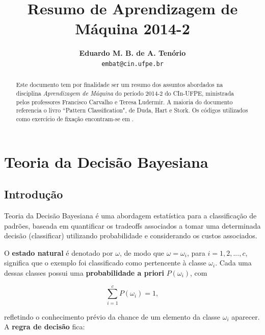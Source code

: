 \documentclass[a4paper,12pt,twocolumn]{article}
\begin{document}
\title{\textbf{Resumo de Aprendizagem de Máquina 2014-2}}
\author{
    \textbf{Eduardo M. B. de A. Tenório}\\
    \small{\texttt{embat@cin.ufpe.br}}
}
\date{}

\maketitle


\begin{abstract}
\begin{itshape}
Este documento tem por finalidade ser um resumo dos assuntos abordados na disciplina \emph{Aprendizagem de Máquina} do período 2014-2 do CIn-UFPE, ministrada pelos professores Francisco Carvalho e Teresa Ludermir. A maioria do documento referencia o livro ``Pattern Classification", de Duda, Hart e Stork. Os códigos utilizados como exercício de fixação encontram-se em .
\end{itshape}
\end{abstract}


\section{Teoria da Decisão Bayesiana}

\subsection{Introdução}

Teoria da Decisão Bayesiana é uma abordagem estatística para a classificação de
padrões, baseada em quantificar os tradeoffs associados a tomar uma determinada
decisão (classificar) utilizando probabilidade e considerando os custos associados.

O \textbf{estado natural} é denotado por $\omega$, de modo que $\omega = \omega_i$, para $i = 1, 2, ..., c$, significa que o exemplo foi classificado como pertencente à classe $\omega_i$. Cada uma dessas classes possui uma \textbf{probabilidade a priori} $P(\omega_i)$, com

\begin{equation}
    \sum_{i=1}^{c} P(\omega_i) = 1,
    \label{eq:sum_priori_prob_to_one}
\end{equation}

\noindent refletindo o conhecimento prévio da chance de um elemento da classe $\omega_i$ aparecer. A \textbf{regra de decisão} fica:
\end{document}
